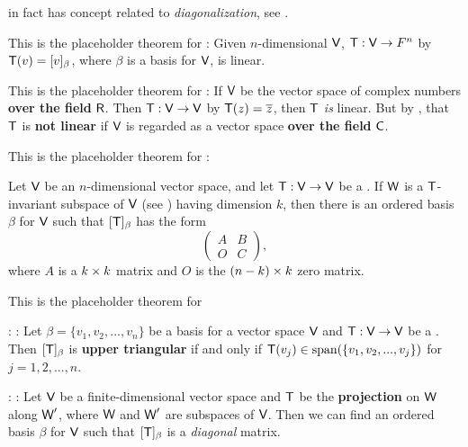 \begin{note}
 in fact has concept related to \emph{diagonalization}, see .
\end{note}

\begin{additional theorem} \label{athm 2.16}
This is the placeholder theorem for : Given \(n\)-dimensional \(\textsf{V}\), \(\textsf{T} : \textsf{V} \to F^n\) by \(\textsf{T}(v) = [v]_{\beta}\), where \(\beta\) is a basis for \(\textsf{V}\), is linear.
\end{additional theorem}

\begin{additional theorem} \label{athm 2.17}
This is the placeholder theorem for :
If \(\textsf{V}\) be the vector space of complex numbers \textbf{over the field} \(\textsf{R}\).
Then \(\textsf{T} : \textsf{V} \to \textsf{V}\) by \(\textsf{T}(z) = \overline{z}\), then \(\textsf{T}\) \emph{is} linear.
But by , that \(\textsf{T}\) is \textbf{not linear} if \(\textsf{V}\) is regarded as a vector space \textbf{over the field} \(\textsf{C}\).

\end{additional theorem}

\begin{additional theorem} \label{athm 2.18}
This is the placeholder theorem for :

Let \(\textsf{V}\) be an \(n\)-dimensional vector space, and let \(\textsf{T} : \textsf{V} \to \textsf{V}\) be a \LTRAN{}.
If \(\textsf{W}\) is a \(\textsf{T}\)-invariant subspace of \(\textsf{V}\) (see ) having dimension \(k\), then there is an ordered basis \(\beta\) for \(\textsf{V}\) such that \([\textsf{T}]_{\beta}\) has the form
\[
    \begin{pmatrix} A & B \\ O & C \end{pmatrix},
\]
where \(A\) is a \(k \times k\) matrix and \(O\) is the \((n - k) \times k\) zero matrix.
\end{additional theorem}

\begin{additional theorem} \label{athm 2.19}
This is the placeholder theorem for

: : 
Let \(\beta = \{ v_1, v_2, ..., v_n \}\) be a basis for a vector space \(\textsf{V}\) and \(\textsf{T} : \textsf{V} \to \textsf{V}\) be a \LTRAN{}.
Then \([\textsf{T}]_{\beta}\) is \textbf{upper triangular} if and only if \(\textsf{T}(v_j) \in \operatorname{span}(\{ v_1, v_2, ..., v_j \})\) for \(j = 1, 2, ..., n\).

: :
Let \(\textsf{V}\) be a finite-dimensional vector space and \(\textsf{T}\) be the \textbf{projection} on \(\textsf{W}\) along \(\textsf{W}'\), where \(\textsf{W}\) and \(\textsf{W}'\) are subspaces of \(\textsf{V}\).
Then we can find an ordered basis \(\beta\) for \(\textsf{V}\) such that \([\textsf{T}]_{\beta}\) is a \emph{diagonal} matrix.
\end{additional theorem}


